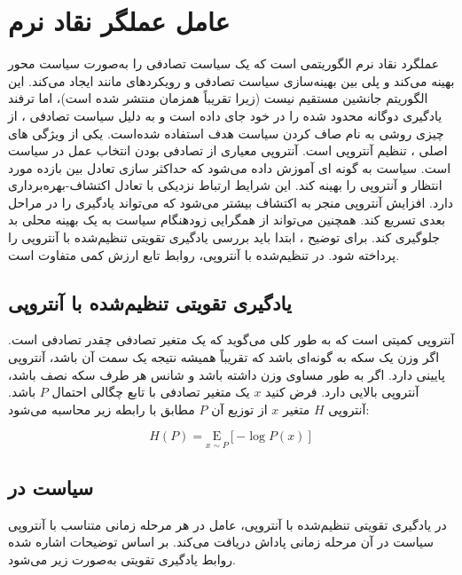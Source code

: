\section{عامل عملگر نقاد نرم}\label{sec:SAC}
عملگرد نقاد نرم
 الگوریتمی است که یک سیاست تصادفی را به‌صورت  سیاست محور بهینه می‌کند و پلی بین بهینه‌سازی سیاست تصادفی و رویکردهای مانند
  ایجاد می‌کند. این الگوریتم جانشین مستقیم 
  نیست (زیرا تقریباً همزمان منتشر شده است)، اما ترفند یادگیری دوگانه محدود شده را در خود جای داده است و به دلیل سیاست تصادفی ، از چیزی روشی به نام صاف کردن سیاست هدف
    استفاده شده‌است.
یکی از ویژگی های اصلی ، تنظیم آنتروپی است.
آنتروپی معیاری از تصادفی بودن انتخاب عمل در سیاست است.
 سیاست به گونه ای آموزش داده می‌شود که حداکثر سازی تعادل بین بازده مورد انتظار و آنتروپی را بهینه کند. این شرایط ارتباط نزدیکی با تعادل اکتشاف-بهره‌برداری دارد. افزایش آنتروپی منجر به اکتشاف بیشتر می‌شود که می‌تواند یادگیری را در مراحل بعدی تسریع کند. همچنین می‌تواند از همگرایی زودهنگام سیاست به یک بهینه محلی بد جلوگیری کند.
 برای توضیح ، ابتدا باید بررسی یادگیری تقویتی تنظیم‌شده با آنتروپی
  را پرداخته شود. در  تنظیم‌شده با آنتروپی، روابط تابع ارزش کمی متفاوت است.
 
\subsection{یادگیری تقویتی تنظیم‌شده با آنتروپی}
 آنتروپی کمیتی است که به طور کلی می‌گوید که یک متغیر تصادفی چقدر تصادفی است. اگر وزن یک سکه به گونه‌ای باشد که تقریباً همیشه نتیجه یک سمت آن باشد، آنتروپی پایینی دارد. اگر به طور مساوی وزن داشته باشد و شانس هر طرف سکه نصف باشد، آنتروپی بالایی دارد.
 فرض کنید \(x\) یک متغیر تصادفی با تابع چگالی احتمال
\(  P\)
   باشد. آنتروپی
\(    H\)
     متغیر \(x\) از توزیع آن
      \(P\)
       مطابق با رابطه زیر محاسبه می‌شود:
      
      \begin{equation}
      	H(P) =  \underset{x \sim P} {\mathrm E} \left[  {-\log P(x)}  \right]
      \end{equation}
      
      
       \subsection{سیاست در }
       در یادگیری تقویتی تنظیم‌شده با آنتروپی، عامل در هر مرحله زمانی متناسب با آنتروپی سیاست در آن مرحله زمانی پاداش دریافت می‌کند. بر اساس توضیحات اشاره شده روابط یادگیری تقویتی به‌صورت زیر می‌شود.
       
